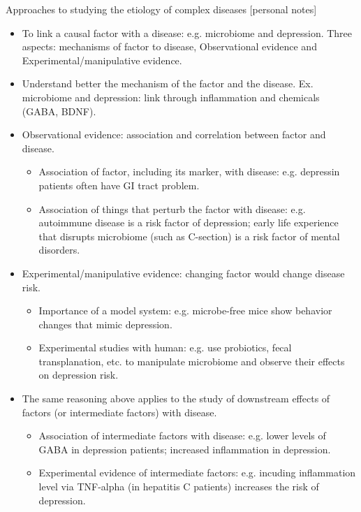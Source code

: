 \documentclass{report}
\begin{document}
Approaches to studying the etiology of complex diseases [personal notes]
\begin{itemize}
	\item To link a causal factor with a disease: e.g. microbiome and depression. Three aspects: mechanisms of factor to disease, Observational evidence and Experimental/manipulative evidence. 

	\item Understand better the mechanism of the factor and the disease. Ex. microbiome and depression: link through inflammation and chemicals (GABA, BDNF). 
	
	\item Observational evidence: association and correlation between factor and disease. 
	\begin{itemize}
		\item Association of factor, including its marker, with disease: e.g. depressin patients often have GI tract problem.  
		
		\item Association of things that perturb the factor with disease: e.g. autoimmune disease is a risk factor of depression; early life experience that disrupts microbiome (such as C-section) is a risk factor of mental disorders.  
	\end{itemize}
	
	\item Experimental/manipulative evidence: changing factor would change disease risk. 
	\begin{itemize}
		\item Importance of a model system: e.g. microbe-free mice show behavior changes that mimic depression.  
		\item Experimental studies with human: e.g. use probiotics, fecal transplanation, etc. to manipulate microbiome and observe their effects on depression risk. 
	\end{itemize}
	
	\item The same reasoning above applies to the study of downstream effects of factors (or intermediate factors) with disease. 
	\begin{itemize}
		\item Association of intermediate factors with disease: e.g. lower levels of GABA in depression patients; increased inflammation in depression.
		
		\item Experimental evidence of intermediate factors: e.g. incuding inflammation level via TNF-alpha (in hepatitis C patients) increases the risk of depression. 
	\end{itemize}
	
\end{itemize}
\end{document}
